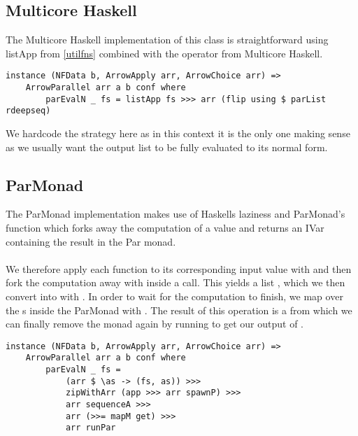 \subsection{Multicore Haskell}
The Multicore Haskell implementation of this class is straightforward using listApp from \ref{utilfns} combined with the  operator from Multicore Haskell.
\begin{lstlisting}[frame=htrbl]
instance (NFData b, ArrowApply arr, ArrowChoice arr) =>
	ArrowParallel arr a b conf where
		parEvalN _ fs = listApp fs >>> arr (flip using $ parList rdeepseq)
\end{lstlisting}
We hardcode the  strategy here as in this context it is the only one making sense as we usually want the output list to be fully evaluated to its normal form.

\subsection{ParMonad}
The ParMonad implementation makes use of Haskells laziness and ParMonad's  function which forks away the computation of a value and returns an IVar containing the result in the Par monad.
\\\\
We therefore apply each function to its corresponding input value with  and then fork the computation away with  inside a  call. This yields a list , which we then convert into  with . In order to wait for the computation to finish, we map over the s inside the ParMonad with . The result of this operation is a  from which we can finally remove the monad again by running  to get our output of \code{[b]}.
\begin{lstlisting}[frame=htrbl]
instance (NFData b, ArrowApply arr, ArrowChoice arr) =>
	ArrowParallel arr a b conf where
		parEvalN _ fs = 
			(arr $ \as -> (fs, as)) >>>
			zipWithArr (app >>> arr spawnP) >>>
			arr sequenceA >>>
			arr (>>= mapM get) >>>
			arr runPar
\end{lstlisting}


